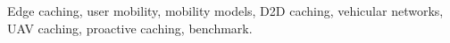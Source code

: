 \documentclass[journal]{IEEEtran}
\begin{document}
\begin{IEEEkeywords}
Edge caching, user mobility, mobility models, D2D caching, vehicular networks, UAV caching, proactive caching, benchmark.
\end{IEEEkeywords}













\end{document}
